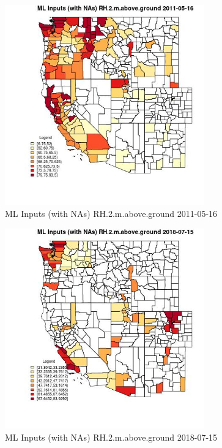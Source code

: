 \begin{figure} 
\centering  
\includegraphics[width=0.77\textwidth]{Code_Outputs/Report_ML_input_PM25_Step4_part_e_de_duplicated_aves_compiled_2019-05-21wNAs_CountyRH2mabovegroundMean2011-05-16.jpg} 
\caption{\label{fig:Report_ML_input_PM25_Step4_part_e_de_duplicated_aves_compiled_2019-05-21wNAsCountyRH2mabovegroundMean2011-05-16}ML Inputs (with NAs) RH.2.m.above.ground 2011-05-16} 
\end{figure} 
 

\begin{figure} 
\centering  
\includegraphics[width=0.77\textwidth]{Code_Outputs/Report_ML_input_PM25_Step4_part_e_de_duplicated_aves_compiled_2019-05-21wNAs_CountyRH2mabovegroundMean2018-07-15.jpg} 
\caption{\label{fig:Report_ML_input_PM25_Step4_part_e_de_duplicated_aves_compiled_2019-05-21wNAsCountyRH2mabovegroundMean2018-07-15}ML Inputs (with NAs) RH.2.m.above.ground 2018-07-15} 
\end{figure} 
 

